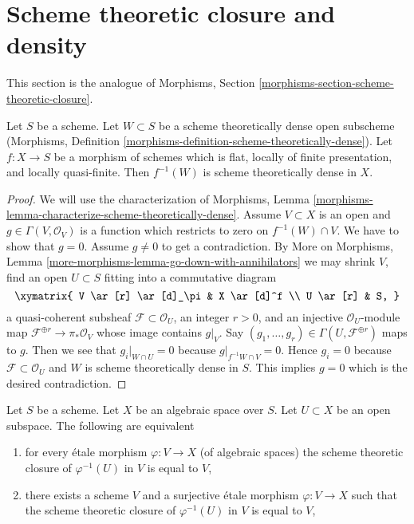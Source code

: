 \section{Scheme theoretic closure and density}
\label{section-scheme-theoretic-closure}

\noindent
This section is the analogue of
Morphisms, Section \ref{morphisms-section-scheme-theoretic-closure}.

\begin{lemma}
\label{lemma-scheme-theoretically-dense-representable}
Let $S$ be a scheme. Let $W \subset S$ be a scheme theoretically
dense open subscheme
(Morphisms, Definition \ref{morphisms-definition-scheme-theoretically-dense}).
Let $f : X \to S$ be a morphism of schemes which is flat, locally of
finite presentation, and locally quasi-finite.
Then $f^{-1}(W)$ is scheme theoretically dense in $X$.
\end{lemma}

\begin{proof}
We will use the characterization of Morphisms, Lemma
\ref{morphisms-lemma-characterize-scheme-theoretically-dense}.
Assume $V \subset X$ is an open and $g \in \Gamma(V, \mathcal{O}_V)$
is a function which restricts to zero on $f^{-1}(W) \cap V$.
We have to show that $g = 0$. Assume $g \not = 0$ to get a
contradiction. By
More on Morphisms, Lemma \ref{more-morphisms-lemma-go-down-with-annihilators}
we may shrink $V$, find an open $U \subset S$ fitting into a
commutative diagram
$$
\xymatrix{
V \ar[r] \ar[d]_\pi & X \ar[d]^f \\
U \ar[r] & S,
}
$$
a quasi-coherent subsheaf $\mathcal{F} \subset \mathcal{O}_U$, an integer
$r > 0$, and an injective $\mathcal{O}_U$-module map
$\mathcal{F}^{\oplus r} \to \pi_*\mathcal{O}_V$
whose image contains $g|_V$. Say
$(g_1, \ldots, g_r) \in \Gamma(U, \mathcal{F}^{\oplus r})$ maps to $g$.
Then we see that $g_i|_{W \cap U} = 0$ because $g|_{f^{-1}W \cap V} = 0$.
Hence $g_i = 0$ because $\mathcal{F} \subset \mathcal{O}_U$ and
$W$ is scheme theoretically dense in $S$.
This implies $g = 0$ which is the desired contradiction.
\end{proof}

\begin{lemma}
\label{lemma-scheme-theoretically-dense}
Let $S$ be a scheme.
Let $X$ be an algebraic space over $S$.
Let $U \subset X$ be an open subspace.
The following are equivalent
\begin{enumerate}
\item for every \'etale morphism $\varphi : V \to X$ (of algebraic spaces)
the scheme theoretic closure of $\varphi^{-1}(U)$ in $V$ is equal to $V$,
\item there exists a scheme $V$ and a surjective \'etale morphism
$\varphi : V \to X$ such that the scheme theoretic closure of
$\varphi^{-1}(U)$ in $V$ is equal to $V$,
\end{enumerate}
\end{lemma}

